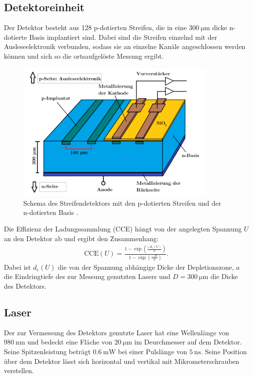 \subsection{Detektoreinheit}
Der Detektor besteht aus 128 p-dotierten Streifen, die in eine $\SI{300}{\micro\meter}$ dicke n-dotierte Basis implantiert sind.
Dabei sind die Streifen einzelnd mit der Ausleseelektronik verbunden, sodass sie an einzelne Kanäle angeschlossen werden können und sich so die ortsaufgelöste Messung ergibt.
\begin{figure}
  \centering
  \includegraphics[height=7cm]{TimosAufrisse/detektorStreifen.png}
  \caption{Schema des Streifendetektors mit den p-dotierten Streifen und der n-dotierten Basis \cite{anleitung}.}
  \label{fig:detektorStreifen}
\end{figure}
Die Effizienz der Ladungssammlung (CCE) hängt von der angelegten Spannung $U$ an den Detektor ab und ergibt den Zusammenhang:
\begin{align}
  \text{CCE}(U) = \frac{1-\exp(\frac{-d_\text{c}(U)}{a})}{1-\exp(\frac{-D}{a})}.
\end{align}
Dabei ist $d_\text{c}(U)$ die von der Spannung abhängige Dicke der Depletionszone, $a$ die Eindringtiefe des zur Messung genutzten Lasers und $D = \SI{300}{\micro\meter}$ die Dicke des Detektors.

\subsection{Laser}
Der zur Vermessung des Detektors genutzte Laser hat eine Wellenlänge von $\SI{980}{\nano\meter}$ und bedeckt eine Fläche von $\SI{20}{\micro\meter}$ im Deurchmesser auf dem Detektor. Seine Spitzenleistung beträgt $\SI{0.6}{\milli\watt}$ bei einer Pulslänge von $\SI{5}{\nano\second}$. Seine Position über dem Detektor lässt sich horizontal und vertikal mit Mikrometerschrauben verstellen.

